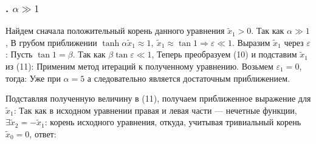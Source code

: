 \subsubsection*{. $\alpha \gg 1$}
Найдем сначала положительный корень данного уравнения $\tilde{x}_1 > 0$. Так как $\alpha \gg 1$,
В грубом приближении $\tanh{\alpha\tilde{x}_1} \approx 1, \ \tilde{x}_1 \approx \tan{1} \Rightarrow \varepsilon \ll 1$.
Выразим $\tilde{x}_1$ через $\varepsilon$:
Пусть $\tan{1} = \beta$. Так как $\beta\tan{\varepsilon} \ll 1$,
Теперь преобразуем (10) и подставим $\tilde{x}_1$ из (11):
Применим метод итераций к полученному уравнению. Возьмем $\varepsilon_1 = 0$, тогда:
Уже при $\alpha = 5$
а следовательно
является достаточным приближением.

Подставляя полученную величину в (11), получаем приближенное выражение для $\tilde{x}_1$:
Так как в исходном уравнении правая и левая части --- нечетные функции, $\exists \tilde{x}_2 = -\tilde{x}_1$:
корень исходного уравнения, откуда, учитывая тривиальный корень $\tilde{x}_0 = 0$, ответ:
